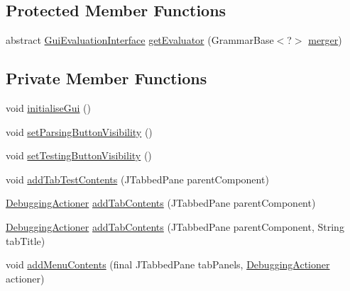 \subsection*{Protected Member Functions}
\begin{DoxyCompactItemize}
\item 
abstract \hyperlink{interfaceit_1_1emarolab_1_1cagg_1_1core_1_1evaluation_1_1interfacing_1_1GuiEvaluationInterface}{Gui\-Evaluation\-Interface} \hyperlink{classit_1_1emarolab_1_1cagg_1_1debugging_1_1DebuggingGui_ab75a846c1c9fb30646a239197536e00d}{get\-Evaluator} (Grammar\-Base$<$?$>$ \hyperlink{classit_1_1emarolab_1_1cagg_1_1debugging_1_1DebuggingGui_a03d18ffb6d8ab6c84ad429c8dac4b886}{merger})
\end{DoxyCompactItemize}
\subsection*{Private Member Functions}
\begin{DoxyCompactItemize}
\item 
void \hyperlink{classit_1_1emarolab_1_1cagg_1_1debugging_1_1DebuggingGui_ab1c178779ccd4aad704c7ec4b2bd79ea}{initialise\-Gui} ()
\item 
void \hyperlink{classit_1_1emarolab_1_1cagg_1_1debugging_1_1DebuggingGui_a4c3bedab3bda08d71d12a29527d976a7}{set\-Parsing\-Button\-Visibility} ()
\item 
void \hyperlink{classit_1_1emarolab_1_1cagg_1_1debugging_1_1DebuggingGui_a5829a6bd8531b3c5cbf9140ce8baf2f1}{set\-Testing\-Button\-Visibility} ()
\item 
void \hyperlink{classit_1_1emarolab_1_1cagg_1_1debugging_1_1DebuggingGui_a37cc9ca883558e7339b9d88a773c15da}{add\-Tab\-Test\-Contents} (J\-Tabbed\-Pane parent\-Component)
\item 
\hyperlink{classit_1_1emarolab_1_1cagg_1_1debugging_1_1DebuggingGui_1_1DebuggingActioner}{Debugging\-Actioner} \hyperlink{classit_1_1emarolab_1_1cagg_1_1debugging_1_1DebuggingGui_a8fbaf89198a53fa71c6a780dca554061}{add\-Tab\-Contents} (J\-Tabbed\-Pane parent\-Component)
\item 
\hyperlink{classit_1_1emarolab_1_1cagg_1_1debugging_1_1DebuggingGui_1_1DebuggingActioner}{Debugging\-Actioner} \hyperlink{classit_1_1emarolab_1_1cagg_1_1debugging_1_1DebuggingGui_aa72db34a1f9c6bf4760bc9c54a31ccc5}{add\-Tab\-Contents} (J\-Tabbed\-Pane parent\-Component, String tab\-Title)
\item 
void \hyperlink{classit_1_1emarolab_1_1cagg_1_1debugging_1_1DebuggingGui_af3d8a6d6551e8719a99b66d6808a5fce}{add\-Menu\-Contents} (final J\-Tabbed\-Pane tab\-Panels, \hyperlink{classit_1_1emarolab_1_1cagg_1_1debugging_1_1DebuggingGui_1_1DebuggingActioner}{Debugging\-Actioner} actioner)
\end{DoxyCompactItemize}
